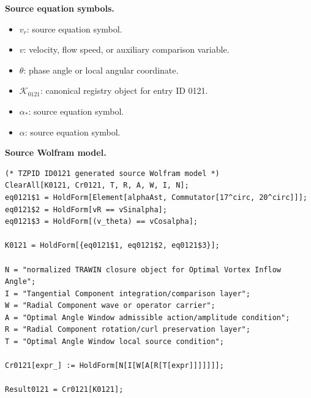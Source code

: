 \begin{minipage}[t]{0.49\linewidth}
\begingroup
\small
\raggedright
\textbf{Source equation symbols.}\par
\begin{itemize}[leftmargin=1.35em,itemsep=1pt,topsep=1pt,parsep=0pt]
    \item $v_r$: source equation symbol.
    \item $v$: velocity, flow speed, or auxiliary comparison variable.
    \item $\theta$: phase angle or local angular coordinate.
    \item $\mathcal{K}_{0121}$: canonical registry object for entry ID 0121.
    \item $\alpha_{\ast}$: source equation symbol.
    \item $\alpha$: source equation symbol.
\end{itemize}
\endgroup
\end{minipage}\hfill
\begin{minipage}[t]{0.47\linewidth}
\begingroup
\scriptsize
\raggedright
\textbf{Source Wolfram model.}\par
\begin{Verbatim}[fontsize=\tiny,breaklines=true,breakanywhere=true]
(* TZPID ID0121 generated source Wolfram model *)
ClearAll[K0121, Cr0121, T, R, A, W, I, N];
eq0121$1 = HoldForm[Element[alphaAst, Commutator[17^circ, 20^circ]]];
eq0121$2 = HoldForm[vR == vSinalpha];
eq0121$3 = HoldForm[(v_theta) == vCosalpha];

K0121 = HoldForm[{eq0121$1, eq0121$2, eq0121$3}];

N = "normalized TRAWIN closure object for Optimal Vortex Inflow Angle";
I = "Tangential Component integration/comparison layer";
W = "Radial Component wave or operator carrier";
A = "Optimal Angle Window admissible action/amplitude condition";
R = "Radial Component rotation/curl preservation layer";
T = "Optimal Angle Window local source condition";

Cr0121[expr_] := HoldForm[N[I[W[A[R[T[expr]]]]]]];

Result0121 = Cr0121[K0121];
\end{Verbatim}
\endgroup
\end{minipage}

